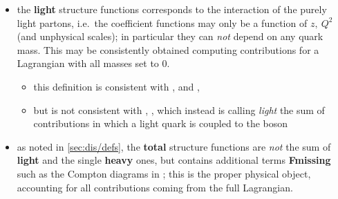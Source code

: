 \begin{itemize}
\item the \textbf{light} structure functions corresponds to the interaction of
  the purely light partons, i.e.\ the coefficient functions may only be a
  function of $z,~Q^2$ (and unphysical scales); in particular they can
  \textit{not} depend on any quark mass.
  This may be consistently obtained computing contributions for a Lagrangian
  with all masses set to $0$.
  \begin{itemize}
    \item this definition is consistent with
      \cite{Vermaseren:2005qc,Moch:2004xu,Moch:1999eb,Moch:2007rq,Moch:2008fj},
      and \qcdnum, \cite{Botje:2010ay}
    \item but is not consistent with \apfel, \cite{Bertone:2013vaa}, which
      instead is calling \textit{light} the sum of contributions in which a
      light quark is coupled to the \ew boson
  \end{itemize}

\item as noted in \cref{sec:dis/defs}, the \textbf{total} structure functions
  are \textit{not} the sum of \textbf{light} and the single \textbf{heavy}
  ones, but contains additional terms \textbf{Fmissing} such as the Compton
  diagrams in \cite{Hekhorn:2019nlf}; this is the proper physical object,
  accounting for all contributions coming from the full Lagrangian.


\end{itemize}
